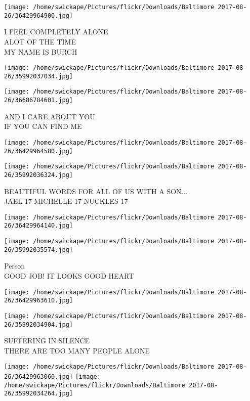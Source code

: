 \documentclass[10pt,letterpaper]{article}
\begin{document}
\vspace{0.25in}
\texttt{[image: /home/swickape/Pictures/flickr/Downloads/Baltimore 2017-08-26/36429964900.jpg]}

I FEEL COMPLETELY ALONE\\
ALOT OF THE TIME\\
MY NAME IS BURCH
\pagebreak

\texttt{[image: /home/swickape/Pictures/flickr/Downloads/Baltimore 2017-08-26/35992037034.jpg]}

\vspace{0.25in}
\texttt{[image: /home/swickape/Pictures/flickr/Downloads/Baltimore 2017-08-26/36686784601.jpg]}

AND I CARE ABOUT YOU\\
IF YOU CAN FIND ME
\pagebreak

\texttt{[image: /home/swickape/Pictures/flickr/Downloads/Baltimore 2017-08-26/36429964580.jpg]}

\vspace{0.25in}
\texttt{[image: /home/swickape/Pictures/flickr/Downloads/Baltimore 2017-08-26/35992036324.jpg]}

BEAUTIFUL WORDS FOR ALL OF US WITH A SON...\\
JAEL 17 MICHELLE 17 NUCKLES 17
\pagebreak

\texttt{[image: /home/swickape/Pictures/flickr/Downloads/Baltimore 2017-08-26/36429964140.jpg]}

\vspace{0.25in}
\texttt{[image: /home/swickape/Pictures/flickr/Downloads/Baltimore 2017-08-26/35992035574.jpg]}

Person\\
GOOD JOB!  IT LOOKS GOOD HEART
\pagebreak

\texttt{[image: /home/swickape/Pictures/flickr/Downloads/Baltimore 2017-08-26/36429963610.jpg]}

\vspace{0.25in}
\texttt{[image: /home/swickape/Pictures/flickr/Downloads/Baltimore 2017-08-26/35992034904.jpg]}

SUFFERING IN SILENCE\\
THERE ARE TOO MANY PEOPLE ALONE
\pagebreak

\texttt{[image: /home/swickape/Pictures/flickr/Downloads/Baltimore 2017-08-26/36429963060.jpg]}
\texttt{[image: /home/swickape/Pictures/flickr/Downloads/Baltimore 2017-08-26/35992034264.jpg]}
\end{document}
